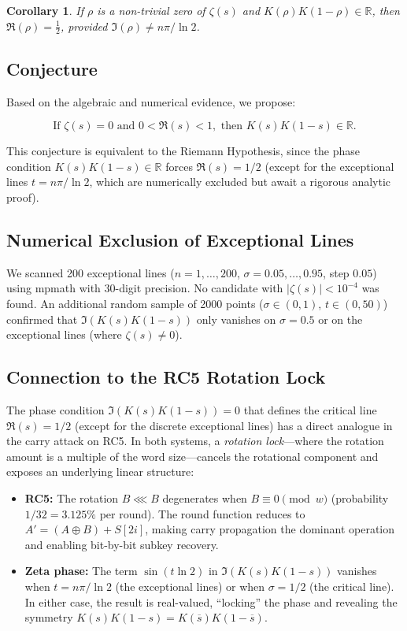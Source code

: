 \documentclass{sbc2023-pdf}%
\theoremstyle{plain}
\newtheorem{corollary}[theorem]{Corollary}
\begin{document}
\begin{corollary}
If \(\rho\) is a non-trivial zero of \(\zeta(s)\) and \(K(\rho)K(1-\rho)\in\mathbb{R}\), then \(\Re(\rho)=\frac12\), provided \(\Im(\rho)\neq n\pi/\ln2\).
\end{corollary}

\subsection{Conjecture}\label{ap:sec:conjecture}

Based on the algebraic and numerical evidence, we propose:

\[
\boxed{\text{If }\zeta(s)=0\text{ and }0<\Re(s)<1,\text{ then }K(s)K(1-s)\in\mathbb{R}.}
\]

This conjecture is equivalent to the Riemann Hypothesis, since the phase condition \(K(s)K(1-s)\in\mathbb{R}\) forces \(\Re(s)=1/2\) (except for the exceptional lines \(t=n\pi/\ln2\), which are numerically excluded but await a rigorous analytic proof).

\subsection{Numerical Exclusion of Exceptional Lines}\label{ap:sec:exclusion}

We scanned 200 exceptional lines (\(n=1,\dots,200\), \(\sigma=0.05,\dots,0.95\), step \(0.05\)) using mpmath with 30-digit precision. No candidate with \(|\zeta(s)|<10^{-4}\) was found. An additional random sample of 2000 points (\(\sigma\in(0,1)\), \(t\in(0,50)\)) confirmed that \(\Im(K(s)K(1-s))\) only vanishes on \(\sigma=0.5\) or on the exceptional lines (where \(\zeta(s)\neq0\)).

\subsection{Connection to the RC5 Rotation Lock}\label{ap:sec:lock}

The phase condition \(\Im(K(s)K(1-s))=0\) that defines the critical line \(\Re(s)=1/2\) (except for the discrete exceptional lines) has a direct analogue in the carry attack on RC5. In both systems, a \textit{rotation lock}---where the rotation amount is a multiple of the word size---cancels the rotational component and exposes an underlying linear structure:

\begin{itemize}
  \item \textbf{RC5:} The rotation \(B \lll B\) degenerates when \(B \equiv 0 \pmod w\) (probability \(1/32 = 3.125\%\) per round). The round function reduces to \(A' = (A \oplus B) + S[2i]\), making carry propagation the dominant operation and enabling bit-by-bit subkey recovery.
  \item \textbf{Zeta phase:} The term \(\sin(t\ln 2)\) in \(\Im(K(s)K(1-s))\) vanishes when \(t = n\pi/\ln 2\) (the exceptional lines) or when \(\sigma = 1/2\) (the critical line). In either case, the result is real-valued, ``locking'' the phase and revealing the symmetry \(K(s)K(1-s)=K(\overline{s})K(1-\overline{s})\).
\end{itemize}
\end{document}
